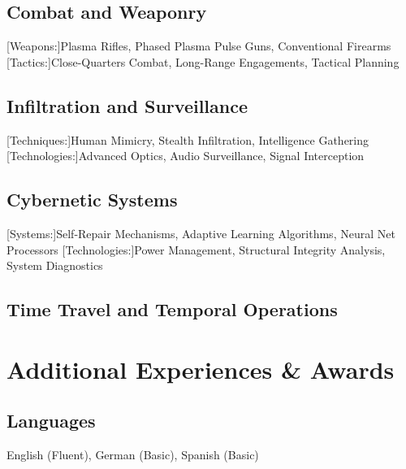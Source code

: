 \documentclass[letterpaper, fontsize=10pt, margin=.5in, spacing=10pt, primarycolor=02442b]{concise-cv}
\begin{document}
\subsection*{Combat and Weaponry}
\begin{skillEnum}
    \skills{\expert}[Weapons:]{Plasma Rifles, Phased Plasma Pulse Guns, Conventional Firearms}
    \skills{\expert}[Tactics:]{Close-Quarters Combat, Long-Range Engagements, Tactical Planning}
\end{skillEnum}

\subsection*{Infiltration and Surveillance}
\begin{skillEnum}
    \skills{\expert}[Techniques:]{Human Mimicry, Stealth Infiltration, Intelligence Gathering}
    \skills{\intermediate}[Technologies:]{Advanced Optics, Audio Surveillance, Signal Interception}
\end{skillEnum}

\subsection*{Cybernetic Systems}
\begin{skillEnum}
    \skills{\expert}[Systems:]{Self-Repair Mechanisms, Adaptive Learning Algorithms, Neural Net Processors}
    \skills{\intermediate}[Technologies:]{Power Management, Structural Integrity Analysis, System Diagnostics}
\end{skillEnum}

\subsection*{Time Travel and Temporal Operations}
\begin{skillEnum}
\end{skillEnum}

\section{Additional Experiences \& Awards}

\subsection*{Languages}
\begin{cvEnum}
    \item English (Fluent), German (Basic), Spanish (Basic)
\end{cvEnum}
\end{document}
